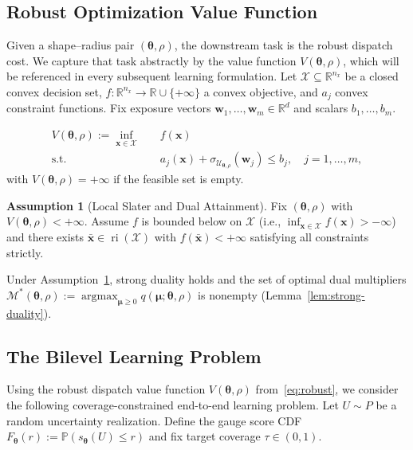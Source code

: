 \documentclass[11pt]{article}
\newcommand{\R}{\mathbb{R}}
\newcommand{\Prob}{\mathbb{P}}
\newcommand{\cU}{\mathcal{U}}
\newcommand{\cX}{\mathcal{X}}
\newcommand{\cM}{\mathcal{M}}
\newcommand{\btheta}{\bm{\theta}}
\newcommand{\bmu}{\bm{\mu}}
\newcommand{\bw}{\bm{w}}
\newcommand{\bx}{\bm{x}}
\DeclareMathOperator{\argmax}{argmax}
\DeclareMathOperator{\ri}{ri}
\theoremstyle{definition}
\newtheorem{assumption}{Assumption}
\begin{document}
\subsection{Robust Optimization Value Function}

Given a shape--radius pair $(\btheta,\rho)$, the downstream task is the robust dispatch cost. We capture that task abstractly by the value function $V(\btheta,\rho)$, which will be referenced in every subsequent learning formulation. Let $\cX \subseteq \R^{n_x}$ be a closed convex decision set, $f: \R^{n_x} \to \R \cup \{+\infty\}$ a convex objective, and $a_j$ convex constraint functions. Fix exposure vectors $\bw_1, \ldots, \bw_m \in \R^d$ and scalars $b_1, \ldots, b_m$.

\begin{equation}\label{eq:robust}
\begin{aligned}
V(\btheta,\rho) := \inf_{\bx \in \cX} \quad & f(\bx) \\
\text{s.t.} \quad & a_j(\bx) + \sigma_{\cU_{\btheta,\rho}}(\bw_j) \leq b_j, \quad j = 1,\ldots,m,
\end{aligned}
\end{equation}
with $V(\btheta,\rho)=+\infty$ if the feasible set is empty.

\begin{assumption}[Local Slater and Dual Attainment]\label{asm:slater}
Fix $(\btheta,\rho)$ with $V(\btheta,\rho)<+\infty$. Assume $f$ is bounded below on $\cX$ (i.e., $\inf_{\bx\in\cX}f(\bx)>-\infty$) and there exists $\bar{\bx}\in\ri(\cX)$ with $f(\bar{\bx})<+\infty$ satisfying all constraints strictly.
\end{assumption}

Under Assumption~\ref{asm:slater}, strong duality holds and the set of optimal dual multipliers $\cM^*(\btheta,\rho):=\argmax_{\bmu\ge 0}q(\bmu;\btheta,\rho)$ is nonempty (Lemma~\ref{lem:strong-duality}).

\subsection{The Bilevel Learning Problem}

Using the robust dispatch value function $V(\btheta,\rho)$ from~\eqref{eq:robust}, we consider the following coverage-constrained end-to-end learning problem. Let $U \sim P$ be a random uncertainty realization. Define the gauge score CDF $F_{\btheta}(r) := \Prob(s_{\btheta}(U) \leq r)$ and fix target coverage $\tau \in (0,1)$.
\end{document}
